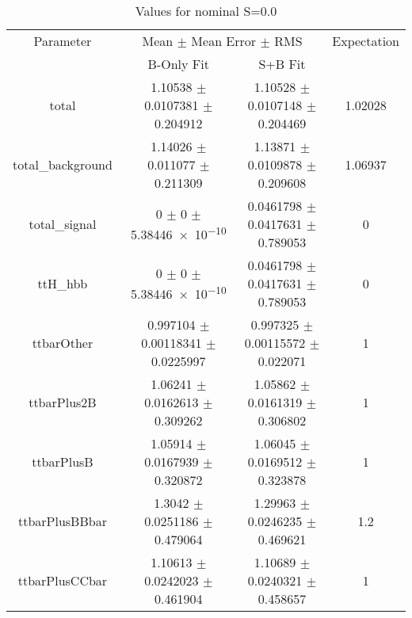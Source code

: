 \begin{table}
\centering
\caption{Values for nominal S=0.0}
\begin{tabular}{cccc}
\toprule
Parameter & \multicolumn{2}{c}{Mean $\pm$ Mean Error $\pm$ RMS} & Expectation\\
 & B-Only Fit & S+B Fit & \\
\midrule
total & \num{1.10538} $\pm$ \num{0.0107381} $\pm$ \num{0.204912} & \num{1.10528} $\pm$ \num{0.0107148} $\pm$ \num{0.204469} & \num{1.02028}\\
total\_background & \num{1.14026} $\pm$ \num{0.011077} $\pm$ \num{0.211309} & \num{1.13871} $\pm$ \num{0.0109878} $\pm$ \num{0.209608} & \num{1.06937}\\
total\_signal & \num{0} $\pm$ \num{0} $\pm$ \num{5.38446e-10} & \num{0.0461798} $\pm$ \num{0.0417631} $\pm$ \num{0.789053} & \num{0}\\
ttH\_hbb & \num{0} $\pm$ \num{0} $\pm$ \num{5.38446e-10} & \num{0.0461798} $\pm$ \num{0.0417631} $\pm$ \num{0.789053} & \num{0}\\
ttbarOther & \num{0.997104} $\pm$ \num{0.00118341} $\pm$ \num{0.0225997} & \num{0.997325} $\pm$ \num{0.00115572} $\pm$ \num{0.022071} & \num{1}\\
ttbarPlus2B & \num{1.06241} $\pm$ \num{0.0162613} $\pm$ \num{0.309262} & \num{1.05862} $\pm$ \num{0.0161319} $\pm$ \num{0.306802} & \num{1}\\
ttbarPlusB & \num{1.05914} $\pm$ \num{0.0167939} $\pm$ \num{0.320872} & \num{1.06045} $\pm$ \num{0.0169512} $\pm$ \num{0.323878} & \num{1}\\
ttbarPlusBBbar & \num{1.3042} $\pm$ \num{0.0251186} $\pm$ \num{0.479064} & \num{1.29963} $\pm$ \num{0.0246235} $\pm$ \num{0.469621} & \num{1.2}\\
ttbarPlusCCbar & \num{1.10613} $\pm$ \num{0.0242023} $\pm$ \num{0.461904} & \num{1.10689} $\pm$ \num{0.0240321} $\pm$ \num{0.458657} & \num{1}\\
\bottomrule
\end{tabular}
\end{table}